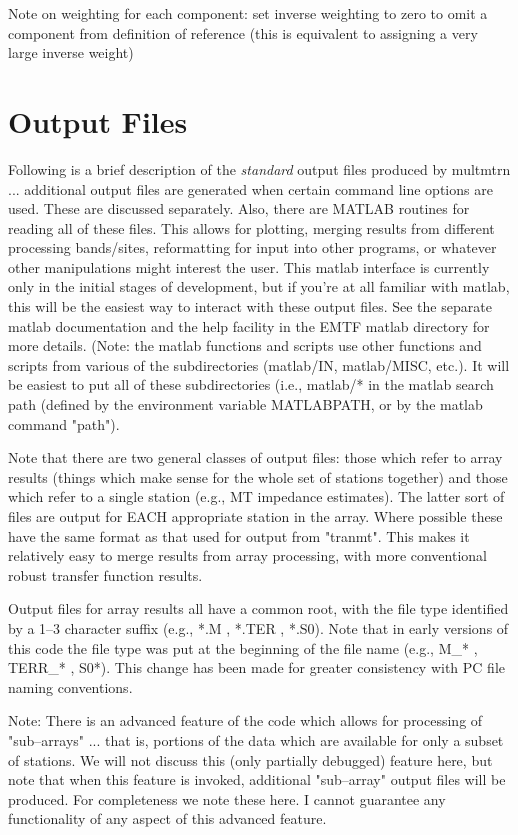 \noindent                                             
Note on weighting for each component:  set inverse weighting to zero to omit 
a component from definition of reference (this is equivalent to assigning a 
very large inverse weight)

\section{Output Files}

Following is a brief description of the {\it standard} output files produced
by multmtrn ... additional output files are generated when certain command
line options are used.  These are discussed separately.  Also, there are
MATLAB routines for reading all of these files.  This allows for plotting,
merging results from different processing bands/sites, reformatting for
input into other programs, or whatever other manipulations might interest
the user.  This matlab interface is currently only in the initial stages
of development, but if you're at all familiar with matlab, this will be
the easiest way to interact with these output files.  See the separate
matlab documentation and the help facility in
the EMTF matlab directory for more details.  (Note:  the matlab functions and
scripts use other functions and scripts from various of the subdirectories
(matlab/IN, matlab/MISC, etc.).  It will be easiest to put all of these subdirectories
(i.e., matlab/* in the matlab search path (defined by the environment variable
MATLABPATH, or by the matlab command "path").

Note that there are two general classes of output files: those which
refer to array results (things which make sense for the whole set of
stations together) and those which refer to a single station (e.g.,
MT impedance estimates).  The latter sort of files are output for
EACH appropriate station in the array.  Where possible these have
the same format as that used for output from "tranmt".  This makes
it relatively easy to merge results from array processing, with more
conventional robust transfer function results.

Output files for array results all have a common root, with the file
type identified by a 1--3 character suffix
(e.g., *.M , *.TER , *.S0).  Note that in early versions
of this code the file type was put at the beginning of the file
name (e.g., M\_* , TERR\_* , S0*).  This change has been made for
greater consistency with PC file naming conventions.

Note:  There is an advanced feature of the code which allows for
processing of "sub--arrays" ... that is, portions of the data which
are available for only a subset of stations.  We will not discuss this
(only partially debugged) feature here, but note that when this
feature is invoked, additional "sub--array" output files will be produced.
For completeness we note these here. I cannot guarantee any functionality
of any aspect of this advanced feature.

